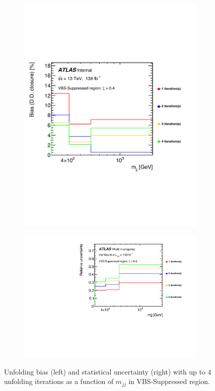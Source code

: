 \begin{figure}[htb]
    \centering
    \begin{subfigure}{.49\textwidth}
        \centering
        \includegraphics[width=.9\linewidth]{figures/Analysis/Unfolding/UnfoldingBiasIteration.pdf}
    \end{subfigure}
    \begin{subfigure}{.49\textwidth}
        \centering
        \includegraphics[width=.9\linewidth]{figures/Analysis/Unfolding/StatUnc_Sup.pdf}
    \end{subfigure}
    \caption{ Unfolding bias (left) and statistical uncertainty (right) with up to $4$ unfolding iterations as a function of $m_{jj}$ in VBS-Suppressed region. \label{fig:BiasStatUnc}}
\end{figure}

